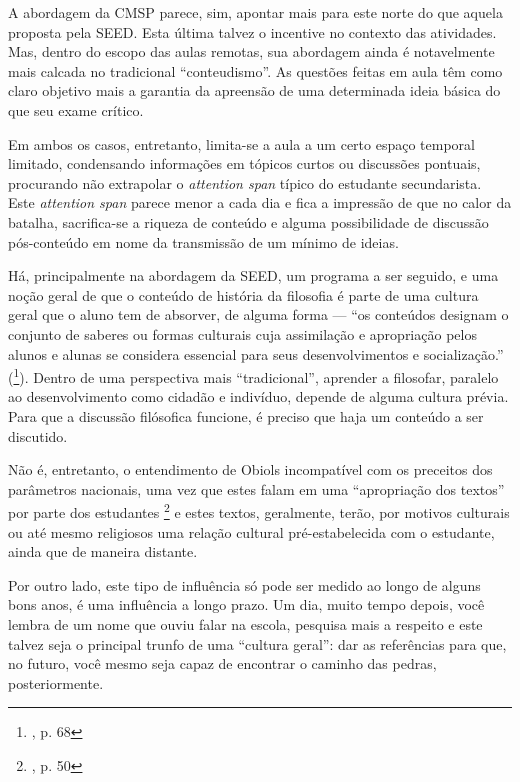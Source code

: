 \documentclass[12pt,a4paper]{article}
\begin{document}
	A abordagem da CMSP parece, sim, apontar mais para este norte do que 
	aquela proposta pela SEED. Esta última talvez o incentive no contexto 
	das atividades. Mas, dentro do escopo das aulas remotas, 
	sua abordagem ainda é notavelmente mais 
	calcada no tradicional “conteudismo”. As questões feitas em aula têm 
	como claro objetivo mais a garantia da apreensão de uma determinada 
	ideia básica do que seu exame crítico. 

	Em ambos os casos, entretanto, limita-se a aula a um certo espaço 
	temporal limitado, condensando informações em tópicos curtos ou 
	discussões pontuais, procurando não extrapolar 
	o \textit{attention span} típico do estudante secundarista. Este 
	\textit{attention span} parece menor a cada dia e fica a impressão de que 
	no calor da batalha, sacrifica-se a riqueza de conteúdo e alguma 
	possibilidade de discussão pós-conteúdo em nome da transmissão de um 
	mínimo de ideias. 
	
	Há, principalmente na abordagem da SEED,
	um programa a ser seguido, e uma noção geral de que o conteúdo 
	de história da filosofia é parte de uma cultura geral que o aluno tem de 
	absorver, de alguma forma --- ``os conteúdos designam o conjunto de 
	saberes ou formas culturais cuja assimilação e apropriação pelos alunos e 
	alunas se considera essencial para seus desenvolvimentos e socialização.'' 
	(\footnote{\cite{obiols}, p. 68}). 
	Dentro de uma perspectiva mais ``tradicional'', 
	aprender a filosofar, paralelo ao desenvolvimento como cidadão e 
	indivíduo, depende de alguma cultura prévia. Para que a discussão 
	filósofica funcione, é preciso que haja um conteúdo a ser discutido. 
	
	Não é, entretanto, o entendimento de Obiols incompatível com os 
	preceitos dos parâmetros nacionais, uma vez que estes falam em uma 
	“apropriação dos textos” por parte dos estudantes
	\footnote{\cite{pcn}, p. 50} e estes textos, geralmente, terão, 
	por motivos culturais ou até mesmo religiosos uma relação 
	cultural pré-estabelecida com o estudante, ainda que de 
	maneira distante. 

	Por outro lado, este tipo de influência só pode ser medido ao longo de 
	alguns bons anos, é uma influência a longo prazo. Um dia, muito tempo 
	depois, você lembra de um nome que ouviu falar na escola, pesquisa mais a 
	respeito 	e este talvez seja o principal trunfo de uma 
	``cultura geral'': dar as referências para que, no futuro, você mesmo seja 
	capaz de encontrar o caminho das pedras, posteriormente. 
\end{document}
